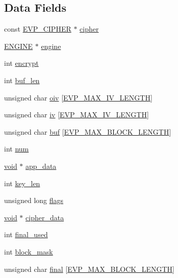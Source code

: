 \subsection*{Data Fields}
\begin{DoxyCompactItemize}
\item 
const \hyperlink{crypto_2ossl__typ_8h_a54a8663a8084d45c31f2786156b55405}{E\+V\+P\+\_\+\+C\+I\+P\+H\+ER} $\ast$ \hyperlink{structevp__cipher__ctx__st_a535356548694b85372c7d1fb18e05f1d}{cipher}
\item 
\hyperlink{crypto_2ossl__typ_8h_abac45b251498719318e60ab8d6192510}{E\+N\+G\+I\+NE} $\ast$ \hyperlink{structevp__cipher__ctx__st_ae4bca26806adfdaf8a28463c98ddf03a}{engine}
\item 
int \hyperlink{structevp__cipher__ctx__st_a3cde830514004debd73105536318890c}{encrypt}
\item 
int \hyperlink{structevp__cipher__ctx__st_a7666bbf00997cc13da27d55cb05d27c4}{buf\+\_\+len}
\item 
unsigned char \hyperlink{structevp__cipher__ctx__st_a5ea6ea2436679880924aeb6823ac9e0d}{oiv} \mbox{[}\hyperlink{include_2openssl_2evp_8h_a80893bc2dbae769441bf6a042cf4069e}{E\+V\+P\+\_\+\+M\+A\+X\+\_\+\+I\+V\+\_\+\+L\+E\+N\+G\+TH}\mbox{]}
\item 
unsigned char \hyperlink{structevp__cipher__ctx__st_a6c9c7c6ccc60886208223861223467ff}{iv} \mbox{[}\hyperlink{include_2openssl_2evp_8h_a80893bc2dbae769441bf6a042cf4069e}{E\+V\+P\+\_\+\+M\+A\+X\+\_\+\+I\+V\+\_\+\+L\+E\+N\+G\+TH}\mbox{]}
\item 
unsigned char \hyperlink{structevp__cipher__ctx__st_a81f7c4e20eade66109ff1aebf13cb82d}{buf} \mbox{[}\hyperlink{include_2openssl_2evp_8h_a64ccdeff3fee6041507240b227ef3646}{E\+V\+P\+\_\+\+M\+A\+X\+\_\+\+B\+L\+O\+C\+K\+\_\+\+L\+E\+N\+G\+TH}\mbox{]}
\item 
int \hyperlink{structevp__cipher__ctx__st_a86cf672daa4e0ad11ad10efc894d19c8}{num}
\item 
\hyperlink{hw__4758__cca_8h_afad4d591c7931ff6dc5bf69c76c96aa0}{void} $\ast$ \hyperlink{structevp__cipher__ctx__st_a2d755a5df39e3da5ae2a0630fbe24c41}{app\+\_\+data}
\item 
int \hyperlink{structevp__cipher__ctx__st_a7d361be539db0a416204f2af38248d08}{key\+\_\+len}
\item 
unsigned long \hyperlink{structevp__cipher__ctx__st_a9e339c2784bd040b26a5112866700bff}{flags}
\item 
\hyperlink{hw__4758__cca_8h_afad4d591c7931ff6dc5bf69c76c96aa0}{void} $\ast$ \hyperlink{structevp__cipher__ctx__st_a35f838b2c27071fbcfd6d602e7c6db0a}{cipher\+\_\+data}
\item 
int \hyperlink{structevp__cipher__ctx__st_af268b4c552dc1562d600ffbf165831b5}{final\+\_\+used}
\item 
int \hyperlink{structevp__cipher__ctx__st_a8b51580dfc3aa0a83b1193699be06e84}{block\+\_\+mask}
\item 
unsigned char \hyperlink{structevp__cipher__ctx__st_a0759886f796a986ba825948ced1ece1e}{final} \mbox{[}\hyperlink{include_2openssl_2evp_8h_a64ccdeff3fee6041507240b227ef3646}{E\+V\+P\+\_\+\+M\+A\+X\+\_\+\+B\+L\+O\+C\+K\+\_\+\+L\+E\+N\+G\+TH}\mbox{]}
\end{DoxyCompactItemize}


